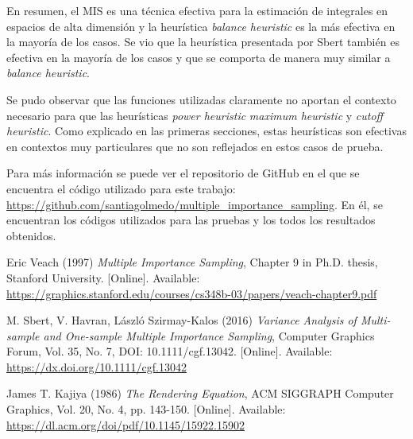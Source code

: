 \documentclass{article}
\begin{document}
En resumen, el MIS es una técnica efectiva para la estimación de integrales en espacios de alta dimensión y la heurística \textit{balance heuristic} es la más efectiva en la mayoría de los casos.
Se vio que la heurística presentada por Sbert también es efectiva en la mayoría de los casos y que se comporta de manera muy similar a \textit{balance heuristic}.

Se pudo observar que las funciones utilizadas claramente no aportan el contexto necesario para que las heurísticas \textit{power heuristic} \textit{maximum heuristic} y \textit{cutoff heuristic}.
Como explicado en las primeras secciones, estas heurísticas son efectivas en contextos muy particulares que no son reflejados en estos casos de prueba.

Para más información se puede ver el repositorio de GitHub en el que se encuentra el código utilizado para este trabajo: \url{https://github.com/santiagolmedo/multiple_importance_sampling}.
En él, se encuentran los códigos utilizados para las pruebas y los todos los resultados obtenidos.

\begin{thebibliography}{99}

Eric Veach (1997) \emph{Multiple Importance Sampling}, Chapter 9 in Ph.D. thesis, Stanford University. [Online]. Available: \url{https://graphics.stanford.edu/courses/cs348b-03/papers/veach-chapter9.pdf}

M. Sbert, V. Havran, László Szirmay-Kalos (2016) \emph{Variance Analysis of Multi-sample and One-sample Multiple Importance Sampling}, Computer Graphics Forum, Vol. 35, No. 7, DOI: 10.1111/cgf.13042. [Online]. Available: \url{https://dx.doi.org/10.1111/cgf.13042}

James T. Kajiya (1986) \emph{The Rendering Equation}, ACM SIGGRAPH Computer Graphics, Vol. 20, No. 4, pp. 143-150. [Online]. Available: \url{https://dl.acm.org/doi/pdf/10.1145/15922.15902}

\end{thebibliography}
\end{document}

